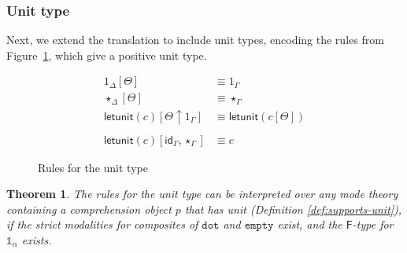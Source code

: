 \documentclass[10pt]{article}
\newtheorem{theorem}{Theorem}
\theoremstyle{definition}
\newcommand{\TYPE}{\,\,\mathsf{Type}}
\newcommand{\id}{\mathsf{id}}
\newcommand{\tdot}{\ensuremath{\mathtt{dot}}}
\newcommand{\tempty}{\ensuremath{\mathtt{empty}}}
\newcommand{\qyields}{\Vdash}
\newcommand\One{\ensuremath{\mathds{1}}}
\newcommand\qunitmatch[1]{\ensuremath{\mathsf{letunit}(#1)}}
\begin{document}
\subsubsection{Unit type}
Next, we extend the translation to include unit types, encoding the
rules from Figure~\ref{fig:qit-unit-rules}, which give a positive unit
type.  

\begin{figure}
\begin{align}
1_\Delta[\Theta] &\equiv 1_\Gamma \\
\star_\Delta[\Theta] &\equiv \star_\Gamma \\ 
\qunitmatch{c}[\Theta \uparrow 1_\Gamma] &\equiv \qunitmatch{c[\Theta]} \\
\nonumber \\
\qunitmatch{c}[\id_\Gamma, \star_\Gamma] &\equiv c
\end{align}
\caption{Rules for the unit type}\label{fig:qit-unit-rules}
\end{figure}

\begin{theorem}
The rules for the unit type can be interpreted over any mode theory
containing a comprehension object $p$ that has unit (Definition \ref{def:supports-unit}), if
the strict modalities for composites of $\tdot$ and $\tempty$ exist, and
the $\mathsf{F}$-type for $\One_\alpha$ exists.
\end{theorem}
\end{document}

